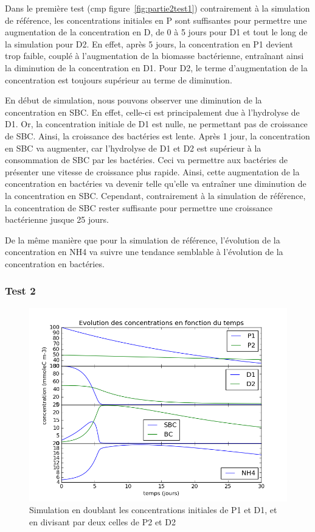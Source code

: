 \par{
Dans le première test (cmp figure~\ref{fig:partie2test1})
contrairement \`a la simulation de r\'ef\'erence, les concentrations initiales en P sont suffisantes pour permettre une augmentation de la concentration en D, de 0 \`a 5 jours pour D1 et tout le long de la simulation pour D2. En effet, apr\`es 5 jours, la concentration en P1 devient trop faible, coupl\'e \`a l'augmentation de la biomasse bact\'erienne, entra\^inant ainsi la diminution de la concentration en D1. Pour D2, le terme d'augmentation de la concentration est toujours sup\'erieur au terme de diminution.
}
\par{
En d\'ebut de simulation, nous pouvons observer une diminution de la concentration en SBC. En effet, celle-ci est principalement due \`a l'hydrolyse de D1. Or, la concentration initiale de D1 est nulle, ne permettant pas de croissance de SBC. Ainsi, la croissance des bact\'eries est lente. Apr\`es 1 jour, la concentration en SBC va augmenter, car l'hydrolyse de D1 et D2 est sup\'erieur \`a la consommation de SBC par les bact\'eries. Ceci va permettre aux bact\'eries de pr\'esenter une vitesse de croissance plus rapide. Ainsi, cette augmentation de la concentration en bact\'eries va devenir telle qu'elle va entra\^iner une diminution de la concentration en SBC. Cependant, contrairement \`a la simulation de r\'ef\'erence, la concentration de SBC rester suffisante pour permettre une croissance bact\'erienne jusque 25 jours.
}
\par{
De la m\^eme mani\`ere que pour la simulation de r\'ef\'erence, l'\'evolution de la concentration en NH4 va suivre une tendance semblable \`a l'\'evolution de la concentration en bact\'eries.
}

\FloatBarrier
\subsubsection{Test 2}

\begin{figure}[h!]
  \includegraphics[width=\textwidth]{partie2/Test2.png}
  \caption{Simulation en doublant les concentrations initiales de P1 et D1, et en divisant par deux celles de P2 et D2
  }
  \label{fig:partie2test2}
\end{figure}

